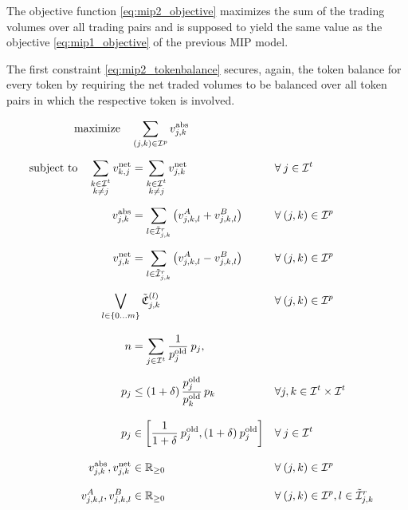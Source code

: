 \documentclass[11pt,parskip=full]{scrartcl}%
\newcommand*{\itokens}{\mathcal{I}^t}       %
\newcommand*{\itokenpairs}{\mathcal{I}^p}   %
\begin{document}
The objective function \eqref{eq:mip2_objective} maximizes the sum of the trading volumes over all
trading pairs and is supposed to yield the same value as the objective \eqref{eq:mip1_objective} of
the previous MIP model.

The first constraint \eqref{eq:mip2_tokenbalance} secures, again, the token balance for every token
by requiring the net traded volumes to be balanced over all token pairs in which the respective
token is involved.

\newpage
\begin{subequations}
\begin{align}
  \text{maximize} \quad & \sum\limits_{(j,k) \in \itokenpairs} v_{j,k}^\mathrm{abs}
  \label{eq:mip2_objective}
  \\[2mm]
  \text{subject to} \quad
  \sum_{\substack{k \in \itokens \\ k \neq j}} v_{k,j}^\mathrm{net}
  &= \sum_{\substack{k \in \itokens \\ k \neq j}} v_{j,k}^\mathrm{net}
  && \forall \> j \in \itokens
  \label{eq:mip2_tokenbalance}
  \\[2mm]
  v_{j,k}^\mathrm{abs}
  &= \sum\limits_{l \in \tilde{\mathcal{I}}_{j,k}^r} \left( v^A_{j,k,l} + v^B_{j,k,l} \right)
  && \forall \> (j,k) \in \itokenpairs
  \label{eq:mip2_volume_aggr_abs}
  \\[2mm]
  v_{j,k}^\mathrm{net}
  &= \sum\limits_{l \in \tilde{\mathcal{I}}_{j,k}^r} \left( v^A_{j,k,l} - v^B_{j,k,l} \right)
  && \forall \> (j,k) \in \itokenpairs
  \label{eq:mip2_volume_aggr_net}
  \\[2mm]
  &\hspace{-1cm}\bigvee\limits_{l \in \{0 \ldots m\}} \tilde{\mathfrak{C}}^{(l)}_{j,k}
  && \forall \> (j,k) \in \itokenpairs
  \\[3mm]
  n
  &= \sum\limits_{j \in \itokens} \frac{1}{p^\mathrm{old}_j} \> p_j,
  \label{eq:mip2_reftoken}
  \\[2mm]
  p_j
  &\le \left(1+\delta\right) \frac{p^\mathrm{old}_j}{p^\mathrm{old}_k} \, p_k
  && \forall j,k \in \itokens \times \itokens
  \label{eq:mip2_maxfluct}
  \\[3mm]
  p_j
  &\in \left[ \frac{1}{1+\delta} \> p^\mathrm{old}_j, (1+\delta) \> p^\mathrm{old}_j \right]
  && \forall \> j \in \itokens
  \\[3mm]
  v_{j,k}^\mathrm{abs}, v_{j,k}^\mathrm{net}
  &\in \mathbb{R}_{\ge 0}
  && \forall \> (j,k) \in \itokenpairs
  \\[3mm]
  v^A_{j,k,l}, v^B_{j,k,l}
  &\in \mathbb{R}_{\ge 0}
  && \forall \> (j,k) \in \itokenpairs, l \in \tilde{\mathcal{I}}_{j,k}^r
\end{align}
\label{eq:mip2}
\end{subequations}
\end{document}
